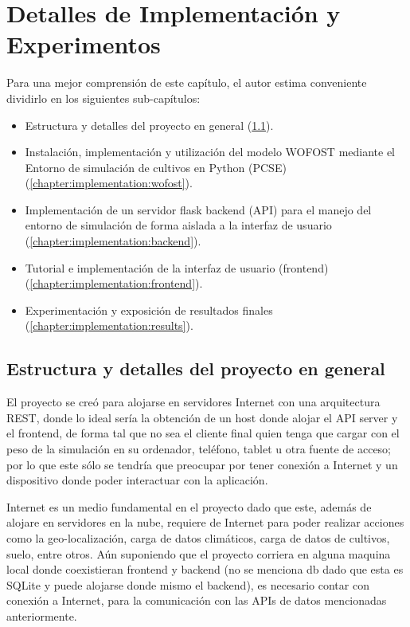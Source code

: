 \chapter{Detalles de Implementación y Experimentos}\label{chapter:implementation}

Para una mejor comprensión de este capítulo, el autor estima conveniente dividirlo en los siguientes sub-capítulos:
\begin{itemize}
	\item Estructura y detalles del proyecto en general (\ref{chapter:implementation:estructure}).
	\item Instalación, implementación y utilización del modelo WOFOST mediante el Entorno de simulación de cultivos en Python (PCSE) (\ref{chapter:implementation:wofost}).
	\item Implementación de un servidor flask backend (API) para el manejo del entorno de simulación de forma aislada a la interfaz de usuario (\ref{chapter:implementation:backend}).
	\item Tutorial e implementación de la interfaz de usuario (frontend) (\ref{chapter:implementation:frontend}).
	\item Experimentación y exposición de resultados finales (\ref{chapter:implementation:results}).
\end{itemize}

\section{Estructura y detalles del proyecto en general}\label{chapter:implementation:estructure}
El proyecto se creó para alojarse en servidores Internet con una arquitectura REST, donde lo ideal sería la obtención de un host donde alojar el API server y el frontend, de forma tal que no sea el cliente final quien tenga que cargar con el peso de la simulación en su ordenador, teléfono, tablet u otra fuente de acceso; por lo que este sólo se tendría que preocupar por tener conexión a Internet y un dispositivo donde poder interactuar con la aplicación.

Internet es un medio fundamental en el proyecto dado que este, además de alojare en servidores en la nube, requiere de Internet para poder realizar acciones como la geo-localización, carga de datos climáticos, carga de datos de cultivos, suelo, entre otros. Aún suponiendo que el proyecto corriera en alguna maquina local donde coexistieran frontend y backend (no se menciona db dado que esta es SQLite y puede alojarse donde mismo el backend), es necesario contar con conexión a Internet, para la comunicación con las APIs de datos mencionadas anteriormente.\\


